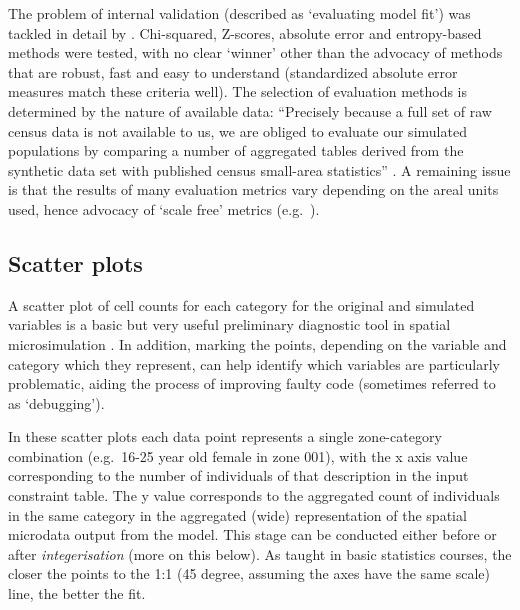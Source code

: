 \documentclass[a4paper,10pt]{article}
\begin{document}
The problem of internal validation
(described as `evaluating model fit') was tackled in detail by \citet{Voas2001}.
Chi-squared, Z-scores, absolute error and entropy-based methods
were tested, with no clear `winner' other than the advocacy of
methods that are robust, fast and easy to understand (standardized absolute
error measures match these criteria well).
The selection of evaluation methods is determined by
the nature of available data:
``Precisely because a full set of raw census data is not
available to us, we are obliged to evaluate our simulated populations by comparing
a number of aggregated tables derived from the synthetic data set with published
census small-area statistics'' \citep[p.~178]{Voas2001}.
A remaining issue is that the results of many evaluation metrics vary depending
on the areal units used, hence advocacy of `scale free' metrics (e.g.~\citep{Malleson2012}).

% 
 

\subsection{Scatter plots}
A scatter plot of cell counts for each category for the original and simulated variables is
a basic but very useful preliminary diagnostic tool in spatial microsimulation
\citep{Ballas2005c,Edwards2009}.
In addition, marking the points, depending on the
variable and category %
which they represent, can help identify which variables are particularly problematic,
aiding the process of improving faulty code (sometimes referred to as `debugging').

In these scatter plots each data point represents a single zone-category
combination (e.g.~16-25 year old female in zone 001), with the x axis value corresponding
to the number of individuals of that description in the input constraint table.
The y value corresponds to the
aggregated count of individuals in the same category in the aggregated
(wide) representation of the spatial microdata output from the model. %
This stage can be conducted either before or after \emph{integerisation}
(more on this below). As taught in basic statistics courses, the closer the points to the
1:1 (45 degree, assuming the axes have the same scale) line, the better the fit.
\end{document}
